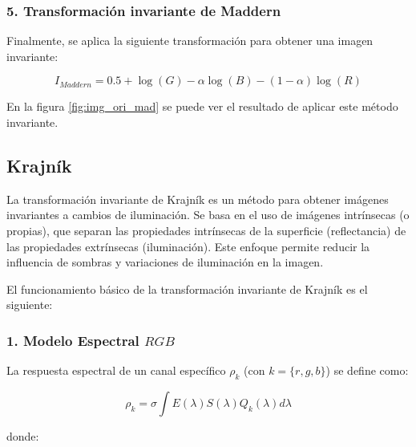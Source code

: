 \subsubsection{5. Transformación invariante de Maddern}

Finalmente, se aplica la siguiente transformación para obtener una imagen invariante:

$$I_{Maddern} =0.5+\log (G)-\alpha \log (B)-(1-\alpha )\log (R)$$

En la figura \ref{fig:img_ori_mad} se puede ver el resultado de aplicar este método invariante.


\subsection{Krajník}\label{krajník}

La transformación invariante de Krajník \cite{krajník2015} es un método para obtener imágenes invariantes a cambios de iluminación. Se basa en el uso de imágenes intrínsecas (o propias), que separan las propiedades intrínsecas de la superficie (reflectancia) de las propiedades extrínsecas (iluminación). Este enfoque permite reducir la influencia de sombras y variaciones de iluminación en la imagen.

El funcionamiento básico de la transformación invariante de Krajník es el siguiente:

\subsubsection{1. Modelo Espectral $RGB$}

La respuesta espectral de un canal específico $\rho_k$ (con $k=\lbrace r,g,b\rbrace$) se define como:

$$\rho_k =\sigma \int E(\lambda )S(\lambda )Q_k (\lambda )d\lambda$$

donde:

